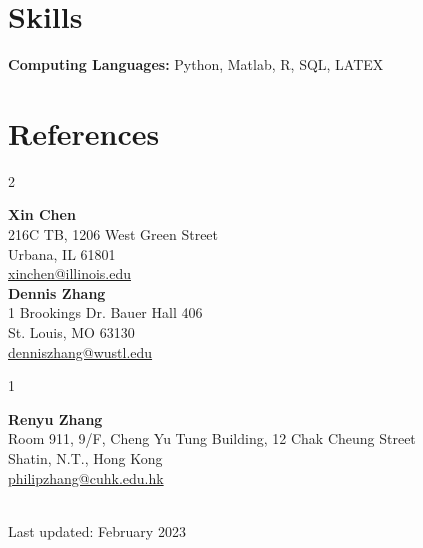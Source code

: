 \documentclass[margin,line]{resume}
\begin{document}
\begin{resume}
    \section{\mysidestyle Skills}
    \textbf{Computing Languages:} Python, Matlab, R, SQL, LATEX\\


% 
%

\section{\mysidestyle References}
\begin{multicols}{2}


\textbf{Xin Chen}\\
216C TB, 1206 West Green Street\\
Urbana, IL 61801\\
\href{mailto:xinchen@illinois.edu}{xinchen@illinois.edu}\\

\textbf{Dennis Zhang}\\
1 Brookings Dr. Bauer Hall 406\\
St. Louis, MO 63130\\
\href{mailto:denniszhang@wustl.edu}{denniszhang@wustl.edu}\\

\end{multicols}

\begin{multicols}{1}



\textbf{Renyu Zhang}\\
Room 911, 9/F, Cheng Yu Tung Building, 12 Chak Cheung Street\\Shatin, N.T., Hong Kong\\
\href{mailto:philipzhang@cuhk.edu.hk}{philipzhang@cuhk.edu.hk}\\

\textbf{}\\

    \end{multicols}

\vspace*{-0.5cm}
\hfill 
\scriptsize Last updated: February 2023
\end{resume}   
\end{document}
